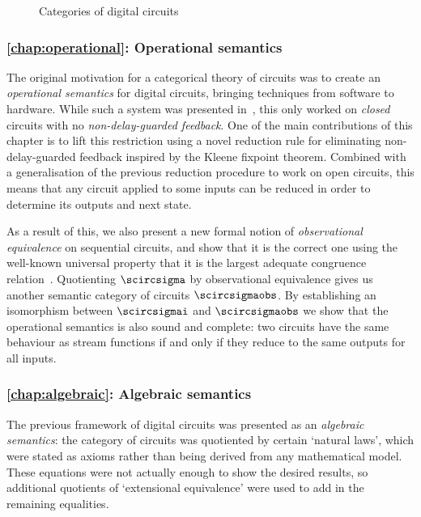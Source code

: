 \begin{figure}
    \centering
    
    \caption{Categories of digital circuits}
    \label{fig:circuits-map}
\end{figure}

\subsubsection{\cref{chap:operational}: Operational semantics}

The original motivation for a categorical theory of circuits was to create an
\emph{operational semantics} for digital circuits, bringing techniques from
software to hardware.
While such a system was presented in~\cite{ghica2017diagrammatic}, this only
worked on \emph{closed} circuits with no \emph{non-delay-guarded feedback}.
One of the main contributions of this chapter is to lift this restriction using
a novel reduction rule for eliminating non-delay-guarded feedback inspired by
the Kleene fixpoint theorem.
Combined with a generalisation of the previous reduction procedure to
work on open circuits, this means that any circuit applied to some inputs can be
reduced in order to determine its outputs and next state.

As a result of this, we also present a new formal notion of
\emph{observational equivalence} on sequential circuits, and show that it is the
correct one using the well-known universal property that it is the largest
adequate congruence relation~\cite{gordon1998operational}.
Quotienting \(\scircsigma\) by observational equivalence gives us another
semantic category of circuits \(\scircsigmaobs\).
By establishing an isomorphism between \(\scircsigmai\) and \(\scircsigmaobs\)
we show that the operational semantics is also sound and complete: two circuits
have the same behaviour as stream functions if and only if they reduce to the
same outputs for all inputs.

\subsubsection{\cref{chap:algebraic}: Algebraic semantics}

The previous framework of digital circuits was presented as an
\emph{algebraic semantics}: the category of circuits was quotiented by certain
`natural laws', which were stated as axioms rather than being derived from any
mathematical model.
These equations were not actually enough to show the desired results, so
additional quotients of `extensional equivalence' were used to add in the
remaining equalities.

